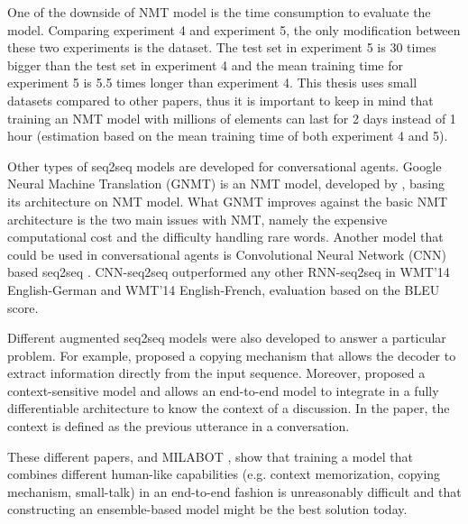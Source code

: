 One of the downside of NMT model is the time consumption to evaluate the model. Comparing experiment 4 and experiment 5, the only modification between these two experiments is the dataset.
The test set in experiment 5 is \num{30} times bigger than the test set in experiment 4 and the mean training time for experiment 5 is \num{5.5} times longer than experiment 4.
This thesis uses small datasets compared to other papers, thus it is important to keep in mind that training an NMT model with millions of elements can last for 2 days instead of 1 hour (estimation based on the mean training time of both experiment 4 and 5).

Other types of seq2seq models are developed for conversational agents. Google Neural Machine Translation (GNMT) is an NMT model, developed by \citet{gnmt-1609.08144}, basing its architecture on \citet{nmt-phd} NMT model.
What GNMT improves against the basic NMT architecture is the two main issues with NMT, namely the expensive computational cost and the difficulty handling rare words.
Another model that could be used in conversational agents is Convolutional Neural Network (CNN) based seq2seq \citep{cnn-seq2seq-1705.03122}. CNN-seq2seq outperformed any other RNN-seq2seq in WMT'14 English-German and WMT'14 English-French, evaluation based on the BLEU score.

Different augmented seq2seq models were also developed to answer a particular problem. For example, \citet{1603.06393} proposed a copying mechanism that allows the decoder to extract information directly from the input sequence.
Moreover, \citet{1506.06714} proposed a context-sensitive model and allows an end-to-end model to integrate in a fully differentiable architecture to know the context of a discussion. In the paper, the context is defined as the previous utterance in a conversation.

These different papers, and MILABOT \citep{alexa-1709.02349}, show that training a model that combines different human-like capabilities (e.g. context memorization, copying mechanism, small-talk) in an end-to-end fashion is unreasonably difficult and that constructing an ensemble-based model might be the best solution today.

